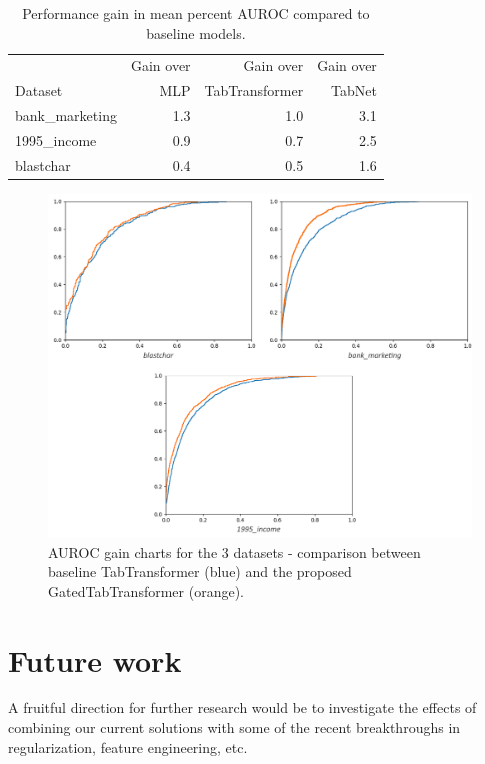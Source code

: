 \documentclass{article}
\begin{document}
\begin{table}[htp]
\caption{
	Performance gain in mean percent AUROC compared to baseline models.
}
\label{tab:results-gain}
\centering
	\begin{tabular}{lrrr}
		\toprule
		        & Gain over & Gain over         & Gain over \\
		Dataset & MLP       & TabTransformer    & TabNet \\
		\midrule
		bank\_marketing  & 1.3 & 1.0 & 3.1 \\
		1995\_income     & 0.9 & 0.7 & 2.5 \\
		blastchar        & 0.4 & 0.5 & 1.6 \\
		\bottomrule
    \end{tabular}
\end{table}

\begin{figure}[hpt]
  \begin{center}
      \includegraphics[width=12.5cm]{roc-comparison.png}
  \end{center}
  \caption{AUROC gain charts for the 3 datasets - comparison between baseline TabTransformer (\textcolor[rgb]{0.12,0.53,0.7}{blue}) and the proposed GatedTabTransformer (\textcolor[rgb]{1,0.4,0}{orange}).}
  \label{fig:auc-results}
\end{figure}

\section{Future work}

A fruitful direction for further research would be to investigate the effects of combining our current solutions with some of the recent breakthroughs in regularization, feature engineering, etc.
\end{document}
